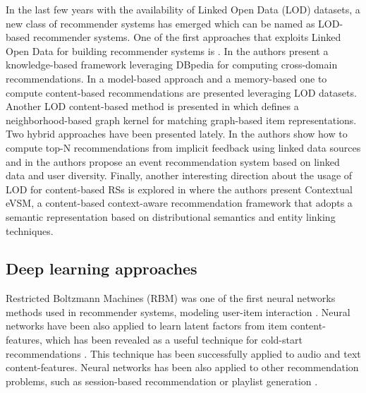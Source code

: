 In the last few years with the availability of Linked Open Data (LOD) datasets, a new class of recommender systems has emerged which can be named as LOD-based recommender systems. 
One of the first approaches that exploits Linked Open Data for building recommender systems is \citep{HeitmannH10}. 
In \citep{Fernandez-Tobias2011} the authors present a knowledge-based framework leveraging DBpedia for computing cross-domain recommendations. 
In \citep{DMOR12,DMORZ12} a model-based approach and a memory-based one to compute content-based recommendations are presented leveraging LOD datasets. Another LOD content-based method is presented in \citep{ODMD14a} which defines a neighborhood-based graph kernel for matching graph-based item representations. 
Two hybrid approaches have been presented lately. In \citep{Ostuni2013} the authors show how to compute top-N recommendations from implicit feedback using linked data sources and in \citep{Khrouf2013} the authors propose an event recommendation system based on linked data and user diversity. 
Finally, another interesting direction about the usage of LOD for content-based RSs is explored in \citep{MustoSLG14} where the authors present Contextual eVSM, a content-based context-aware recommendation framework that adopts a semantic representation based on distributional semantics and entity linking techniques.%

\subsection{Deep learning approaches}

Restricted Boltzmann Machines (RBM) was one of the first neural networks methods used in recommender systems, modeling user-item interaction \citep{salakhutdinov2007restricted}. Neural networks have been also applied to learn latent factors from item content-features, which has been revealed as a useful technique for cold-start recommendations \cite{wang2015collaborative}. This technique has been successfully applied to audio \citep{Oord2013} and text \citep{bansal2016ask} content-features. Neural networks has been also applied to other recommendation problems, such as session-based recommendation \citep{hidasi2015session} or playlist generation \citep{vall2017music}.


